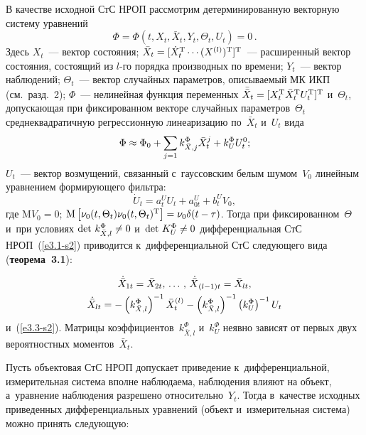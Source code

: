\begin{multicols}{2}
В качестве исходной СтС НРОП рассмотрим детерминированную  векторную сис\-те\-му 
уравнений
   \begin{equation}
   \Phi = \Phi \left( t, X_t, \bar X_t, Y_t, \Theta_t, U_t\right) =0\,.
    \label{e3.1-s2}
    \end{equation}
Здесь $X_t$~--- вектор состояния; $\bar X_t\hm= [ \dot X_t^{\mathrm{T}} \cdots 
(X^{(l)})^{\mathrm{T}}]^{\mathrm{T}}$~--- расширенный вектор со\-сто\-яния, со\-сто\-ящий из $l$-го порядка 
производных по времени; $Y_t$~--- вектор наблюдений; $\Theta_t$~--- вектор 
случайных па\-ра\-мет\-ров, опи\-сы\-ва\-емый МК ИКП (см.\ разд.~2); $\Phi$~--- нелинейная 
функция переменных  $\bar{\bar X}_t \hm= [ X_t^{\mathrm{T}} \bar X_t^{\mathrm{T}} U_t^{\mathrm{T}}]^{\mathrm{T}}$ 
и~$\Theta_t$, до\-пус\-ка\-ющая при фиксированном векторе случайных па\-ра\-мет\-ров~$\Theta_t$ 
среднеквадратичную регрессионную линеаризацию по~$\bar X_t$  и~$U_t$ 
вида
      \begin{equation*}
    \Phi\approx \Phi_0 + \sum\limits_{j=1} k_{\bar X,j}^\Phi \bar X_t^j + k_U^\Phi U_t^0;
\end{equation*}
$U_t$~--- вектор возмущений, связанный с~гауссовским белым шумом~$V_0$ линейным 
уравнением формирующего фильтра:
     \begin{equation}
    \dot U_t = a_t^U U_t +  a_{0t}^U + b_t^U V_0,
    \label{e3.3-s2}
    \end{equation}
где $\mathrm{M} V_0 =0$; $ \mathrm{M} \lk \nu_0 (t,\Theta_t) \nu_0(t,\Theta_t)^{\mathrm{T}}\rk\hm = \nu_0 
\delta (t-\tau)$. Тогда при фиксированном~$\Theta$ и~при условиях $\mathrm{det}\ 
k_{\bar X, l}^\Phi\hm \ne 0$ и~$ \mathrm{det}\ K_U^\Phi \hm\ne 0$ дифференциальная СтС НРОП~(\ref{e3.1-s2}) 
приводится к~дифференциальной СтС следующего вида (\textbf{теорема~3.1}):

\noindent
      \begin{multline*}
      \dot{\bar X}_{1t} = \bar X_{2t} ,\,\ldots\,,\, {\dot{\bar X}}_{(l-1)t} =\bar 
X_{lt},\\
    \dot{\bar X}_{lt}= -\left(k_{\bar X,l}^\Phi\right)^{-1} \bar X_t^{(l)}-
\left(k_{\bar X, l}^\Phi\right)^{-1}\left(k_{U}^\Phi\right)^{-1} U_t
\end{multline*}
и~(\ref{e3.3-s2}). Мат\-ри\-цы коэффициентов~$k_{\bar X, l}^\Phi$ и~$k_{U}^\Phi$ неявно зависят 
от первых двух вероятностных моментов~$\bar X_t$.



Пусть объектовая СтС НРОП допускает приведение к~дифференциальной, измерительная 
сис\-те\-ма вполне наблюдаема, наблюдения влияют на объект, а~уравнение наблюдения 
разрешено относительно~$Y_t$. Тогда в~качестве исходных приведенных 
дифференциальных уравнений (объект и~измерительная сис\-те\-ма) можно принять 
следующую:


\end{multicols}
